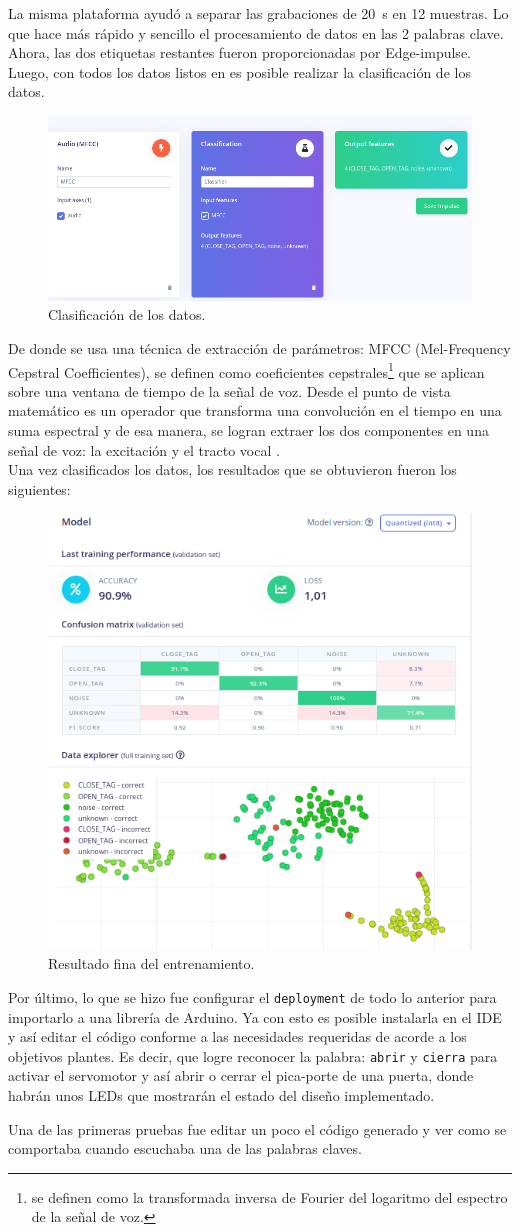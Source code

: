La misma plataforma ayudó a separar las grabaciones de  \SI{20}{\s} en 12 muestras. Lo que hace más rápido y sencillo el procesamiento de datos en las 2 palabras clave. Ahora, las dos etiquetas restantes fueron proporcionadas por Edge-impulse.\\
Luego, con todos los datos listos en \cite{web10} es posible realizar la clasificación de los datos.
    \begin{figure}[H]
    \centering
    \includegraphics[width=.55\linewidth]{Img/classifier.png}
    \caption{Clasificación de los datos.}
    \label{classi}
    \end{figure}
De donde se usa una técnica de extracción de parámetros: MFCC (Mel-Frequency Cepstral Coefficientes), se definen como coeficientes cepstrales\footnote{se definen como la transformada inversa de Fourier del logaritmo del espectro de la señal de voz.} que se aplican sobre una ventana de tiempo de la señal de voz. Desde el punto de vista matemático es un operador que transforma una convolución en el tiempo en una suma espectral y de esa manera, se logran extraer los dos componentes en una señal de voz: la excitación y el tracto vocal \cite{web9}.\\
Una vez clasificados los datos, los resultados que se obtuvieron fueron los siguientes:
    \begin{figure}[H]
    \centering
    \includegraphics[width=.55\linewidth]{Img/training.png}
    \caption{Resultado fina del entrenamiento.}
    \label{training}
    \end{figure}
Por último, lo que se hizo fue configurar el \texttt{deployment} de todo lo anterior para importarlo a una librería de Arduino. Ya con esto es posible instalarla en el IDE y así editar el código conforme a las necesidades requeridas de acorde a los objetivos plantes. Es decir, que logre reconocer la palabra: \texttt{abrir} y \texttt{cierra} para activar el servomotor y así abrir o cerrar el pica-porte de una puerta, donde habrán unos LEDs que mostrarán el estado del diseño implementado.\par
Una de las primeras pruebas fue editar un poco el código generado y ver como se comportaba cuando escuchaba una de las palabras claves.

